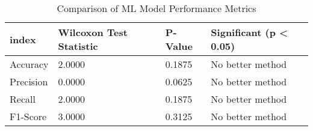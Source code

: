 \begin{table}[htbp]
\caption{Comparison of ML Model Performance Metrics}
\label{tab:model_comparison}
\begin{tabular}{llll}
\toprule
index & Wilcoxon Test Statistic & P-Value & Significant (p < 0.05) \\
\midrule
Accuracy & 2.0000 & 0.1875 & No better method \\
Precision & 0.0000 & 0.0625 & No better method \\
Recall & 2.0000 & 0.1875 & No better method \\
F1-Score & 3.0000 & 0.3125 & No better method \\
\bottomrule
\end{tabular}
\end{table}

